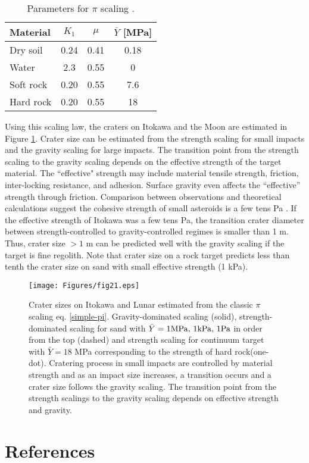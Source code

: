 \documentclass[3p,authoryear]{elsarticle}
\begin{document}
\begin{table}[htbp]
	\centering
	\caption{Parameters for $\pi$ scaling \citep{holsapple1993}.}
	\label{pi-params}
	\small
	\begin{tabular}{lccc}\hline
	Material & $K_1$ & $\mu$ & $\bar{Y}$ [MPa]\\ \hline
	Dry soil & 0.24 & 0.41 & 0.18 \\
	Water & 2.3 & 0.55 & 0 \\
	Soft rock & 0.20 & 0.55 & 7.6\\
	Hard rock & 0.20 & 0.55 & 18\\ \hline
	\end{tabular}
	\centering
\end{table}

Using this scaling law, the craters on Itokawa and the Moon are estimated in Figure \ref{impactor-crater}.
Crater size can be estimated from the strength scaling for small impacts and the gravity scaling for large impacts.
The transition point from the strength scaling to the gravity scaling depends on the effective strength of the target material.
The ``effective" strength may include material tensile strength, friction, inter-locking resistance, and adhesion. Surface gravity even affects the ``effective'' strength through friction.
Comparison between observations and theoretical calculations suggest the cohesive strength of small asteroids is a few tens Pa \citep{sanchez2014, rozitis2014}.
If the effective strength of Itokawa was a few tens Pa, the transition crater diameter between strength-controlled to gravity-controlled regimes is smaller than 1 m.
Thus, crater size $> 1$ m can be predicted well with the gravity scaling if the target is fine regolith.
Note that crater size on a rock target predicts less than tenth the crater size on sand with small effective strength (1 kPa).
\begin{figure}[htbp]
	\centering
	\texttt{[image: Figures/fig21.eps]}
	\caption{Crater sizes on Itokawa and Lunar estimated from the classic $\pi$ scaling eq. \eqref{simple-pi}. Gravity-dominated scaling (solid), strength-dominated scaling for sand with $\bar{Y}=1 {\rm MPa},\, 1{\rm kPa},\, 1{\rm Pa}$ in order from the top (dashed) and strength scaling for continuum target with $\bar{Y}=18$ MPa corresponding to the strength of hard rock(one-dot). Cratering process in small impacts are controlled by material strength and as an impact size increases, a transition occurs and a crater size follows the gravity scaling. The transition point from the strength scalings to the gravity scaling depends on effective strength and gravity.}
	\label{impactor-crater}
	\centering
\end{figure}

\section*{References}

\end{document}
